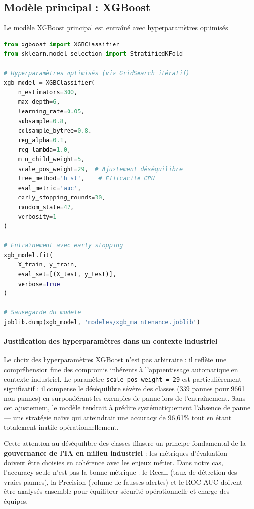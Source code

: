 \documentclass[a4paper,12pt]{report}
\begin{document}
\subsection{Modèle principal : XGBoost}

Le modèle XGBoost principal est entraîné avec hyperparamètres optimisés :

\begin{lstlisting}[language=Python]
from xgboost import XGBClassifier
from sklearn.model_selection import StratifiedKFold

# Hyperparamètres optimisés (via GridSearch itératif)
xgb_model = XGBClassifier(
    n_estimators=300,
    max_depth=6,
    learning_rate=0.05,
    subsample=0.8,
    colsample_bytree=0.8,
    reg_alpha=0.1,
    reg_lambda=1.0,
    min_child_weight=5,
    scale_pos_weight=29,  # Ajustement déséquilibre
    tree_method='hist',    # Efficacité CPU
    eval_metric='auc',
    early_stopping_rounds=30,
    random_state=42,
    verbosity=1
)

# Entraînement avec early stopping
xgb_model.fit(
    X_train, y_train,
    eval_set=[(X_test, y_test)],
    verbose=True
)

# Sauvegarde du modèle
joblib.dump(xgb_model, 'modeles/xgb_maintenance.joblib')
\end{lstlisting}

\paragraph{Justification des hyperparamètres dans un contexte industriel}

Le choix des hyperparamètres XGBoost n'est pas arbitraire : il reflète une compréhension fine des compromis inhérents à l'apprentissage automatique en contexte industriel. Le paramètre \texttt{scale\_pos\_weight = 29} est particulièrement significatif : il compense le déséquilibre sévère des classes (339 pannes pour 9661 non-pannes) en surpondérant les exemples de panne lors de l'entraînement. Sans cet ajustement, le modèle tendrait à prédire systématiquement l'absence de panne — une stratégie naïve qui atteindrait une accuracy de 96,61\% tout en étant totalement inutile opérationnellement.

Cette attention au déséquilibre des classes illustre un principe fondamental de la \textbf{gouvernance de l'IA en milieu industriel} : les métriques d'évaluation doivent être choisies en cohérence avec les enjeux métier. Dans notre cas, l'accuracy seule n'est pas la bonne métrique : le Recall (taux de détection des vraies pannes), la Precision (volume de fausses alertes) et le ROC-AUC doivent être analysés ensemble pour équilibrer sécurité opérationnelle et charge des équipes.
\end{document}
